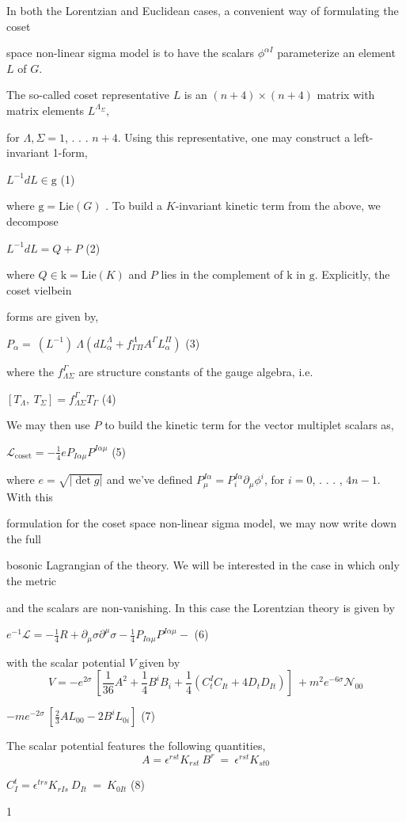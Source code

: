 \documentclass[a4paper,12pt]{article}
\begin{document}
In both the Lorentzian and Euclidean cases, a convenient way of formulating the coset

space non-linear sigma model is to have the scalars $\phi^{\alpha I}$ parameterize an element $L$ of $G.$

The so-called coset representative $L$ is an $(n+4)\times(n+4)$ matrix with matrix elements $L^{\Lambda_{\Sigma}},$

for $\Lambda, \Sigma=1$, . . . $n+4$. Using this representative, one may construct a left-invariant 1-form,
\begin{center}
$L^{-1}dL\in \mathrm{g}$   (1)
\end{center}
where $\mathrm{g}=\mathrm{L}\mathrm{i}\mathrm{e}(G)$ . To build a $K$-invariant kinetic term from the above, we decompose
\begin{center}
$L^{-1}dL=Q+P$   (2)
\end{center}
where $Q\in \mathrm{k}=\mathrm{L}\mathrm{i}\mathrm{e}(K)$ and $P$ lies in the complement of $\mathrm{k}$ in $\mathrm{g}$. Explicitly, the coset vielbein

forms are given by,
\begin{center}
$P_{\alpha}=\ (L^{-1})\ \Lambda(dL_{\alpha}^{\Lambda}+f_{\Gamma\Pi}^{\Lambda}A^{\Gamma}L_{\alpha}^{\Pi})$   (3)
\end{center}
where the $f_{\Lambda\Sigma}^{\Gamma}$ are structure constants of the gauge algebra, i.e.
\begin{center}
$[T_{\Lambda},\ T_{\Sigma}]=f_{\Lambda\Sigma}^{\Gamma}T_{\Gamma}$   (4)
\end{center}
We may then use $P$ to build the kinetic term for the vector multiplet scalars as,
\begin{center}
$\displaystyle \mathcal{L}_{\mathrm{c}\mathrm{o}\mathrm{s}\mathrm{e}\mathrm{t}}=-\frac{1}{4}eP_{I\alpha\mu}P^{I\alpha\mu}$   (5)
\end{center}
where $e = \sqrt{|\det g|}$ and we've defined $P_{\mu}^{I\alpha} = P_{i}^{I\alpha}\partial_{\mu}\phi^{i}$, for $i = 0$, . . . , $4n- 1$. With this

formulation for the coset space non-linear sigma model, we may now write down the full

bosonic Lagrangian of the theory. We will be interested in the case in which only the metric

and the scalars are non-vanishing. In this case the Lorentzian theory is given by
\begin{center}
$e^{-1}\displaystyle \mathcal{L}=-\frac{1}{4}R+\partial_{\mu}\sigma\partial^{\mu}\sigma-\frac{1}{4}P_{I\alpha\mu}P^{I\alpha\mu}-$   (6)
\end{center}
with the scalar potential $V$ given by
$$
V=-e^{2\sigma}\ [\frac{1}{36}A^{2}+\frac{1}{4}B^{i}B_{i}+\frac{1}{4}(C_{t}^{I}C_{It}+4D_{t}D_{It})]\ +m^{2}e^{-6\sigma}\mathcal{N}_{00}
$$
\begin{center}
$-me^{-2\sigma}\displaystyle \ [\frac{2}{3}AL_{00}-2B^{i}L_{0i}]$   (7)
\end{center}
The scalar potential features the following quantities,
$$
A=\epsilon^{rst}K_{rst}\ B^{r}\ =\ \epsilon^{rst}K_{st0}
$$
\begin{center}
$C_{I}^{t}=\epsilon^{trs}K_{rIs}\ D_{It}\ =\ K_{0It}$   (8)
\end{center}
1
\end{document}

